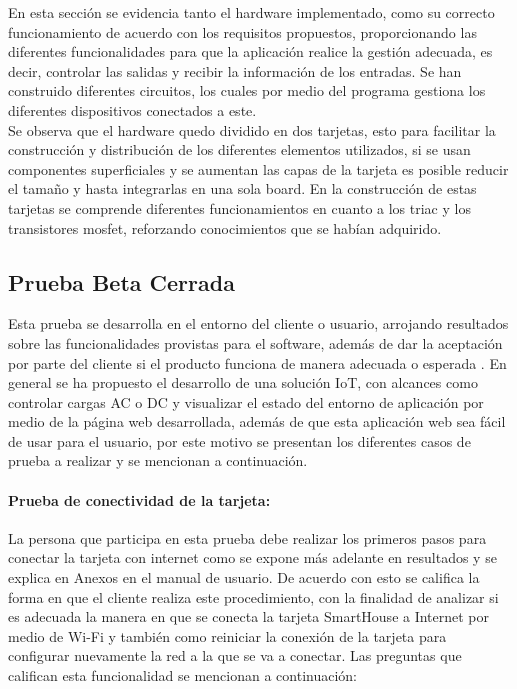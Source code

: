 En esta sección se evidencia tanto el hardware implementado, como su correcto funcionamiento de acuerdo con los requisitos propuestos, proporcionando las diferentes funcionalidades para que la aplicación realice la gestión adecuada, es decir, controlar las salidas y recibir la información de los entradas. Se han construido diferentes circuitos, los cuales por medio del programa gestiona los diferentes dispositivos conectados a este.\\

Se observa que el hardware quedo dividido en dos tarjetas, esto para facilitar la construcción y distribución de los diferentes elementos utilizados, si se usan componentes superficiales y se aumentan las capas de la tarjeta es posible reducir el tamaño y hasta integrarlas en una sola board. En la construcción de estas tarjetas se comprende diferentes funcionamientos en cuanto a los triac y los transistores mosfet, reforzando conocimientos que se habían adquirido.\\

\subsection{Prueba Beta Cerrada}

Esta prueba se desarrolla en el entorno del cliente o usuario, arrojando resultados sobre las funcionalidades provistas para el software, además de dar la aceptación por parte del cliente si el producto funciona de manera adecuada o esperada \cite{PB}. En general se ha propuesto el desarrollo de una solución IoT, con alcances como controlar cargas AC o DC y visualizar el estado del entorno de aplicación por medio de la página web desarrollada, además de que esta aplicación web sea fácil de usar para el usuario, por este motivo se presentan los diferentes casos de prueba a realizar y se mencionan a continuación.\\

\paragraph{Prueba de conectividad de la tarjeta:} La persona que participa en esta prueba debe realizar los primeros pasos para conectar la tarjeta con internet como se expone más adelante en resultados y se explica en Anexos en el manual de usuario. De acuerdo con esto se califica la forma en que el cliente realiza este procedimiento, con la finalidad de analizar si es adecuada la manera en que se conecta la tarjeta SmartHouse a Internet por medio de Wi-Fi y también como reiniciar la conexión de la tarjeta para configurar nuevamente la red a la que se va a conectar. Las preguntas que califican esta funcionalidad se mencionan a continuación:\\

